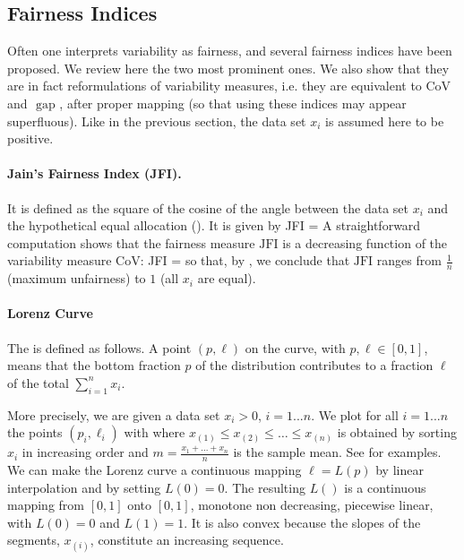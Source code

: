 \subsection{Fairness Indices}
Often one interprets variability as fairness, and several
fairness indices have been proposed. We review here the two
most prominent ones. We also show that they are in fact
reformulations of variability measures, i.e. they are
equivalent to $\mbox{CoV}$ and $\mbox{ gap }$, after proper
mapping (so that using these indices may appear superfluous).
Like in the previous section, the data set $x_i$ is assumed
here to be positive.

\paragraph{Jain's Fairness Index (JFI).}
It is
defined as the square of the cosine of the angle
between the data set $x_i$ and the hypothetical
equal allocation (). It is given by
 \be
 \mbox{JFI} =
\label{eq-jfi}
  \ee
A straightforward computation shows that the
fairness
 measure $\mbox{JFI}$ is a decreasing function of the
 variability measure $\mbox{CoV}$:
 \be
\mbox{JFI} = 
 \ee
 so that, by , we conclude that
 $\mbox{JFI}$ ranges from $\frac{1}{n}$ (maximum
 unfairness) to $1$ (all $x_i$ are equal).

 \begin{figure}
 \label{fig-jfi}
 \end{figure}

\paragraph{Lorenz Curve}
The  is defined as follows. A
point $(p,\ell)$ on the curve, with $p, \ell \in
[0,1]$, means that the bottom fraction $p$ of the
distribution contributes to a fraction $\ell$ of
the total $\sum_{i=1}^n x_i$.

More precisely, we are given a data set $x_i >0$,
$i=1...n$. We plot for all $i=1...n$ the points
$(p_i, \ell_i)$ with
 \be
 \ee
where $x_{(1)} \leq x_{(2)}\leq \ldots \leq x_{(n)}$ is obtained by sorting $x_i$ in increasing order and $m = \frac{x_{1} + ...+ x_{n} }{n}$ is the sample mean.
See  for examples. We can make
the Lorenz curve a continuous mapping $\ell=L(p)$
by linear interpolation and by setting $L(0)= 0$.
The resulting $L()$ is a continuous mapping from
$[0,1]$ onto $[0,1]$, monotone non decreasing, piecewise linear, with $L(0)= 0$ and $L(1)=1$. It is also convex because the slopes of the segments, $x_{(i)}$, constitute an increasing sequence.

